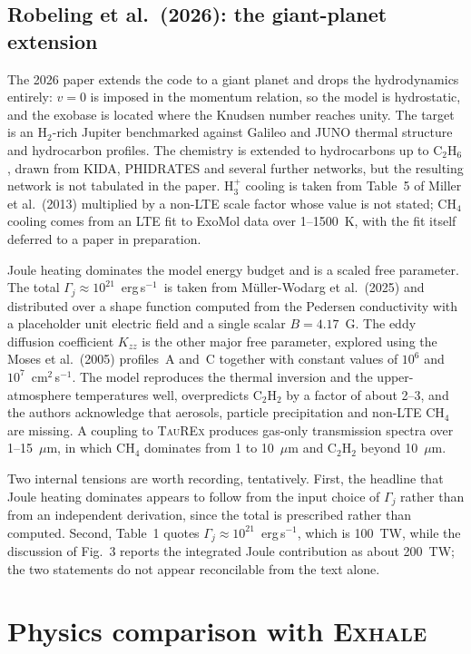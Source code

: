 \documentclass{my_memo}
\newcommand{\EXHALE}{\textsc{Exhale}}
\newcommand{\Kzz}{K_{zz}}
\newcommand{\ergs}{erg\,s$^{-1}$}
\begin{document}
\subsection{Robeling et al.\ (2026): the giant-planet extension}

The 2026 paper extends the code to a giant planet and drops the hydrodynamics entirely: $v = 0$ is
imposed in the momentum relation, so the model is hydrostatic, and the exobase is located where
the Knudsen number reaches unity. The target is an H$_2$-rich Jupiter benchmarked against Galileo
and JUNO thermal structure and hydrocarbon profiles. The chemistry is extended to hydrocarbons up
to C$_2$H$_6$, drawn from KIDA, PHIDRATES and several further networks, but the resulting network
is not tabulated in the paper. H$_3^+$ cooling is taken from Table~5 of Miller et al.\ (2013)
multiplied by a non-LTE scale factor whose value is not stated; CH$_4$ cooling comes from an LTE
fit to ExoMol data over 1--1500~K, with the fit itself deferred to a paper in preparation.

Joule heating dominates the model energy budget and is a scaled free parameter. The total
$\Gamma_j \approx 10^{21}$~\ergs\ is taken from M\"uller-Wodarg et al.\ (2025) and distributed
over a shape function computed from the Pedersen conductivity with a placeholder unit electric
field and a single scalar $B = 4.17$~G. The eddy diffusion coefficient $\Kzz$ is the other major
free parameter, explored using the Moses et al.\ (2005) profiles~A and~C together with constant
values of $10^{6}$ and $10^{7}$~cm$^{2}$\,s$^{-1}$. The model reproduces the thermal inversion and
the upper-atmosphere temperatures well, overpredicts C$_2$H$_2$ by a factor of about 2--3, and the
authors acknowledge that aerosols, particle precipitation and non-LTE CH$_4$ are missing. A
coupling to \textsc{TauREx} produces gas-only transmission spectra over 1--15~$\mu$m, in which
CH$_4$ dominates from 1 to 10~$\mu$m and C$_2$H$_2$ beyond 10~$\mu$m.

Two internal tensions are worth recording, tentatively. First, the headline that Joule heating
dominates appears to follow from the input choice of $\Gamma_j$ rather than from an independent
derivation, since the total is prescribed rather than computed. Second, Table~1 quotes
$\Gamma_j \approx 10^{21}$~\ergs, which is 100~TW, while the discussion of Fig.~3 reports the
integrated Joule contribution as about 200~TW; the two statements do not appear reconcilable from
the text alone.

\section{Physics comparison with \EXHALE}
\end{document}
